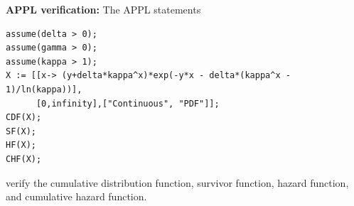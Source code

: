 \documentclass[12pt,fullpage]{article}
\begin{document}

\newpage

\noindent
{\bf APPL verification:}
The APPL statements
\begin{verbatim}
assume(delta > 0);
assume(gamma > 0);
assume(kappa > 1);
X := [[x-> (y+delta*kappa^x)*exp(-y*x - delta*(kappa^x - 1)/ln(kappa))],
      [0,infinity],["Continuous", "PDF"]];
CDF(X);
SF(X);
HF(X);
CHF(X);
\end{verbatim}
verify the cumulative distribution function, survivor function, hazard function, and cumulative hazard function.
\end{document}
